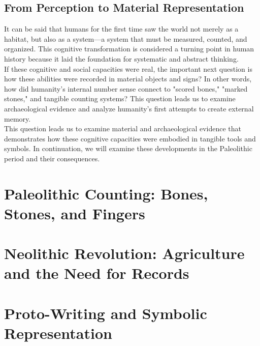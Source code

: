 \subsection{From Perception to Material Representation}

It can be said that humans for the first time saw the world not merely as a habitat, but also as a system—a system that must be measured, counted, and organized. This cognitive transformation is considered a turning point in human history because it laid the foundation for systematic and abstract thinking.\\
If these cognitive and social capacities were real, the important next question is how these abilities were recorded in material objects and signs? In other words, how did humanity's internal number sense connect to "scored bones," "marked stones," and tangible counting systems? This question leads us to examine archaeological evidence and analyze humanity's first attempts to create external memory.\\
This question leads us to examine material and archaeological evidence that demonstrates how these cognitive capacities were embodied in tangible tools and symbols. In continuation, we will examine these developments in the Paleolithic period and their consequences.
\newpage
\section{Paleolithic Counting: Bones, Stones, and Fingers}

\section{Neolithic Revolution: Agriculture and the Need for Records}

\section{Proto-Writing and Symbolic Representation}

